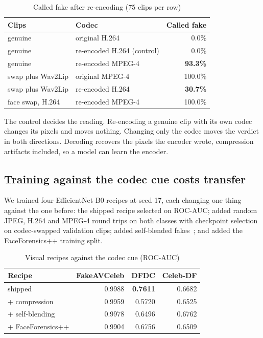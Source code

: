 \documentclass[conference]{IEEEtran}
\begin{document}
\begin{table}[htbp]
\caption{Called fake after re-encoding (75 clips per row)}
\label{tab:codec}
\centering
\begin{tabular}{llr}
\toprule
Clips & Codec & Called fake \\
\midrule
genuine & original H.264 & 0.0\% \\
genuine & re-encoded H.264 (control) & 0.0\% \\
genuine & re-encoded MPEG-4 & \textbf{93.3\%} \\
swap plus Wav2Lip & original MPEG-4 & 100.0\% \\
swap plus Wav2Lip & re-encoded H.264 & \textbf{30.7\%} \\
face swap, H.264 & re-encoded MPEG-4 & 100.0\% \\
\bottomrule
\end{tabular}
\end{table}

The control decides the reading. Re-encoding a genuine clip with its own codec
changes its pixels and moves nothing. Changing only the codec moves the verdict
in both directions. Decoding recovers the pixels the encoder wrote,
compression artifacts included, so a model can learn the encoder.

\subsection{Training against the codec cue costs transfer}

We trained four EfficientNet-B0 recipes at seed 17, each changing one thing
against the one before: the shipped recipe selected on ROC-AUC; added random
JPEG, H.264 and MPEG-4 round trips on both classes with checkpoint selection on
codec-swapped validation clips; added self-blended fakes~\cite{sbi}; and added
the FaceForensics++ training split.

\begin{table}[htbp]
\caption{Visual recipes against the codec cue (ROC-AUC)}
\label{tab:recipes}
\centering
\begin{tabular}{lrrr}
\toprule
Recipe & FakeAVCeleb & DFDC & Celeb-DF \\
\midrule
shipped & 0.9988 & \textbf{0.7611} & 0.6682 \\
+ compression & 0.9959 & 0.5720 & 0.6525 \\
+ self-blending & 0.9978 & 0.6496 & 0.6762 \\
+ FaceForensics++ & 0.9904 & 0.6756 & 0.6509 \\
\bottomrule
\end{tabular}
\end{table}
\end{document}
